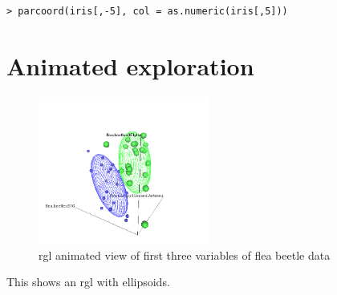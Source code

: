 \singlespacing
\begin{verbatim}
> parcoord(iris[,-5], col = as.numeric(iris[,5]))
\end{verbatim}
\onehalfspacing


\section{Animated exploration}

\begin{figure}
\begin{center}
\includegraphics[width = 0.5\textwidth]{images/rgl}
\caption{rgl animated view of first three variables of flea beetle data}
\label{rgl}
\end{center}
\end{figure}

This shows an rgl with ellipsoids.







